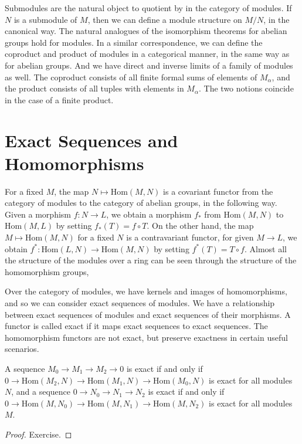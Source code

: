 Submodules are the natural object to quotient by in the category of modules. If $N$ is a submodule of $M$, then we can define a module structure on $M/N$, in the canonical way. The natural analogues of the isomorphism theorems for abelian groups hold for modules. In a similar correspondence, we can define the coproduct and product of modules in a categorical manner, in the same way as for abelian groups. And we have direct and inverse limits of a family of modules as well. The coproduct consists of all finite formal sums of elements of $M_\alpha$, and the product consists of all tuples with elements in $M_\alpha$. The two notions coincide in the case of a finite product.

\section{Exact Sequences and Homomorphisms}

For a fixed $M$, the map $N \mapsto \text{Hom}(M,N)$ is a covariant functor from the category of modules to the category of abelian groups, in the following way. Given a morphism $f: N \to L$, we obtain a morphism $f_*$ from $\text{Hom}(M,N)$ to $\text{Hom}(M,L)$ by setting $f_*(T) = f \circ T$. On the other hand, the map $M \mapsto \text{Hom}(M,N)$ for a fixed $N$ is a contravariant functor, for given $M \to L$, we obtain $f^*: \text{Hom}(L,N) \to \text{Hom}(M,N)$ by setting $f^*(T) = T \circ f$. Almost all the structure of the modules over a ring can be seen through the structure of the homomorphism groups, 

Over the category of modules, we have kernels and images of homomorphisms, and so we can consider exact sequences of modules. We have a relationship between exact sequences of modules and exact sequences of their morphisms. A functor is called exact if it maps exact sequences to exact sequences. The homomorphism functors are not exact, but preserve exactness in certain useful scenarios.

\begin{theorem}
    A sequence $M_0 \to M_1 \to M_2 \to 0$ is exact if and only if $0 \to \text{Hom}(M_2,N) \to \text{Hom}(M_1,N) \to \text{Hom}(M_0,N)$ is exact for all modules $N$, and a sequence $0 \to N_0 \to N_1 \to N_2$ is exact if and only if $0 \to \text{Hom}(M,N_0) \to \text{Hom}(M,N_1) \to \text{Hom}(M,N_2)$ is exact for all modules $M$.
\end{theorem}
\begin{proof}
    Exercise.
\end{proof}

